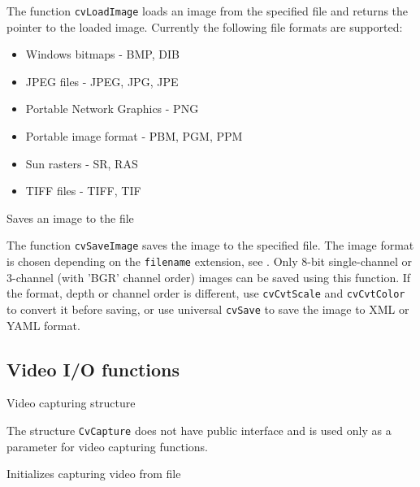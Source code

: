 The function \texttt{cvLoadImage} loads an image from the specified file and returns the pointer to the loaded image. Currently the following file formats are supported:
\begin{itemize}
\item Windows bitmaps - BMP, DIB
\item JPEG files - JPEG, JPG, JPE
\item Portable Network Graphics - PNG
\item Portable image format - PBM, PGM, PPM
\item Sun rasters - SR, RAS
\item TIFF files - TIFF, TIF
\end{itemize}


Saves an image to the file


\begin{description}
\end{description}

The function \texttt{cvSaveImage} saves the image to the specified file. The image format is chosen depending on the \texttt{filename} extension, see . Only 8-bit single-channel or 3-channel (with 'BGR' channel order) images can be saved using this function. If the format, depth or channel order is different, use \texttt{cvCvtScale} and \texttt{cvCvtColor} to convert it before saving, or use universal \texttt{cvSave} to save the image to XML or YAML format.

\subsection{Video I/O functions}


Video capturing structure


The structure \texttt{CvCapture} does not have public interface and is used only as a parameter for video capturing functions.


Initializes capturing video from file

